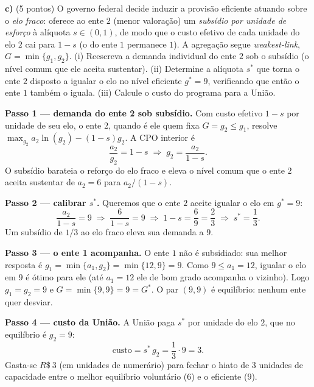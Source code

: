 \textbf{c)} (5 pontos) O governo federal decide induzir a provisão eficiente atuando sobre o \emph{elo fraco}: oferece ao ente $2$ (menor valoração) um \emph{subsídio por unidade de esforço} à alíquota $s\in(0,1)$, de modo que o custo efetivo de cada unidade do elo $2$ cai para $1-s$ (o do ente $1$ permanece $1$). A agregação segue \emph{weakest-link}, $G=\min\{g_1,g_2\}$. (i) Reescreva a demanda individual do ente $2$ sob o subsídio (o nível comum que ele aceita sustentar). (ii) Determine a alíquota $s^{*}$ que torna o ente $2$ disposto a igualar o elo no nível eficiente $g^{*}=9$, verificando que então o ente $1$ também o iguala. (iii) Calcule o custo do programa para a União.
\resolucaobox{7.2cm}
\begin{solucao}
\textbf{Passo 1 --- demanda do ente 2 sob subsídio.} Com custo efetivo $1-s$ por unidade de seu elo, o ente $2$, quando é ele quem fixa $G=g_2\le g_1$, resolve $\max_{g_2} a_2\ln(g_2)-(1-s)g_2$. A CPO interior é
\[
\frac{a_2}{g_2}=1-s\;\Longrightarrow\; g_2=\frac{a_2}{1-s}.
\]
O subsídio barateia o reforço do elo fraco e eleva o nível comum que o ente $2$ aceita sustentar de $a_2=6$ para $a_2/(1-s)$.

\textbf{Passo 2 --- calibrar $s^{*}$.} Queremos que o ente $2$ aceite igualar o elo em $g^{*}=9$:
\[
\frac{a_2}{1-s}=9\;\Longrightarrow\;\frac{6}{1-s}=9\;\Longrightarrow\;1-s=\frac{6}{9}=\frac{2}{3}\;\Longrightarrow\; s^{*}=\frac{1}{3}.
\]
Um subsídio de $1/3$ ao elo fraco eleva sua demanda a $9$.

\textbf{Passo 3 --- o ente 1 acompanha.} O ente $1$ não é subsidiado: sua melhor resposta é $g_1=\min\{a_1,g_2\}=\min\{12,9\}=9$. Como $9\le a_1=12$, igualar o elo em $9$ é ótimo para ele (até $a_1=12$ ele de bom grado acompanha o vizinho). Logo $g_1=g_2=9$ e $G=\min\{9,9\}=9=G^{*}$. O par $(9,9)$ é equilíbrio: nenhum ente quer desviar.

\textbf{Passo 4 --- custo da União.} A União paga $s^{*}$ por unidade do elo $2$, que no equilíbrio é $g_2=9$:
\[
\text{custo}=s^{*}\,g_2=\frac{1}{3}\cdot 9=3.
\]
Gasta-se $R\$~3$ (em unidades de numerário) para fechar o hiato de $3$ unidades de capacidade entre o melhor equilíbrio voluntário ($6$) e o eficiente ($9$).


\end{solucao}
